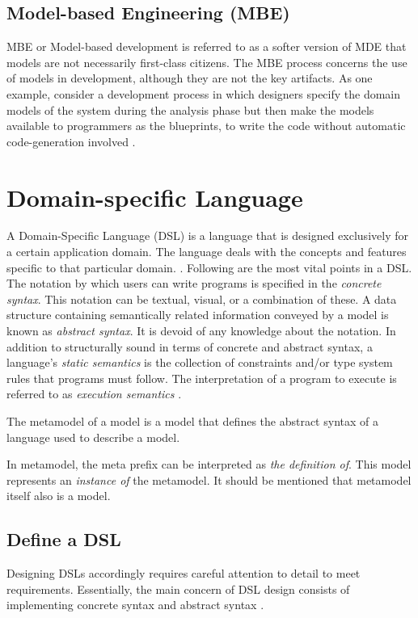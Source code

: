 \subsection{Model-based Engineering (MBE)}
MBE or Model-based development is referred to as a softer version of MDE that models are not necessarily first-class citizens. The MBE process concerns the use of models in development, although they are not the key artifacts. As one example, consider a development process in which designers specify the domain models of the system during the analysis phase but then make the models available to programmers as the blueprints, to write the code without automatic code-generation involved \cite{mdse}.


\section{Domain-specific Language}
A Domain-Specific Language (DSL) is a language that is designed exclusively for a certain application domain. The language deals with the concepts and features specific to that particular domain. \cite{dsl}.
Following are the most vital points in a DSL. The notation by which users can write programs is specified in the \textit{concrete syntax}. This notation can be textual, visual, or a combination of these. A data structure containing semantically related information conveyed by a model is known as \textit{abstract syntax}. It is devoid of any knowledge about the notation. In addition to structurally sound in terms of concrete and abstract syntax, a language's \textit{static semantics} is the collection of constraints and/or type system rules that programs must follow. The interpretation of a program to execute is referred to as \textit{execution semantics} \cite{dsl-eng}.

\begin{definition}
The metamodel of a model is a model that defines the abstract syntax of a language used to describe a model. 
\end{definition}

In metamodel, the meta prefix can be interpreted as \textit{the definition of}. This model represents an \textit{instance of} the metamodel. It should be mentioned that metamodel itself also is a model.

\subsection{Define a DSL}
Designing DSLs accordingly requires careful attention to detail to meet requirements. Essentially, the main concern of DSL design consists of implementing concrete syntax and abstract syntax \cite{engineering_modeling_languages}.
 
